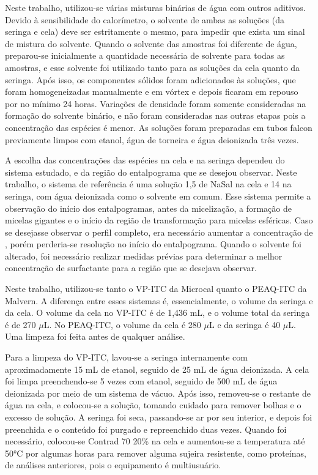 		Neste trabalho, utilizou-se várias misturas binárias de água com outros aditivos. Devido à sensibilidade do calorímetro, o solvente de ambas as soluções (da seringa e cela) deve ser estritamente o mesmo, para impedir que exista um sinal de mistura do solvente. Quando o solvente das amostras foi diferente de água, preparou-se inicialmente a quantidade necessária de solvente para todas as amostras, e esse solvente foi utilizado tanto para as soluções da cela quanto da seringa. Após isso, os componentes sólidos foram adicionados às soluções, que foram homogeneizadas manualmente e em vórtex e depois ficaram em repouso por no mínimo 24 horas. Variações de densidade foram somente consideradas na formação do solvente binário, e não foram consideradas nas outras etapas pois a concentração das espécies é menor. As soluções foram preparadas em tubos falcon previamente limpos com etanol, água de torneira e água deionizada três vezes.
		
		A escolha das concentrações das espécies na cela e na seringa dependeu do sistema estudado, e da região do entalpograma que se desejou observar. Neste trabalho, o sistema de referência é uma solução 1,5 \mM{} de NaSal na cela e \TTAB{} 14 \mM{} na seringa, com água deionizada como o solvente em comum. Esse sistema permite a observação do início dos entalpogramas, antes da micelização, a formação de micelas gigantes e o início da região de transformação para micelas esféricas. Caso se desejasse observar o perfil completo, era necessário aumentar a concentração de \TTAB, porém perderia-se resolução no início do entalpograma. Quando o solvente foi alterado, foi necessário realizar medidas prévias para determinar a melhor concentração de surfactante para a região que se desejava observar.
		
		Neste trabalho, utilizou-se tanto o VP-ITC da Microcal quanto o PEAQ-ITC da Malvern. A diferença entre esses sistemas é, essencialmente, o volume da seringa e da cela. O volume da cela no VP-ITC é de 1,436 mL, e o volume total da seringa é de 270 \(\mu\)L. No PEAQ-ITC, o volume da cela é 280 \(\mu\)L e da seringa é 40 \(\mu\)L. Uma limpeza foi feita antes de qualquer análise.
		
		Para a limpeza do VP-ITC, lavou-se a seringa internamente com aproximadamente 15 mL de etanol, seguido de 25 mL de água deionizada. A cela foi limpa preenchendo-se 5 vezes com etanol, seguido de 500 mL de água deionizada por meio de um sistema de vácuo. Após isso, removeu-se o restante de água na cela, e colocou-se a solução, tomando cuidado para remover bolhas e o excesso de solução. A seringa foi seca, passando-se ar por seu interior, e depois foi preenchida e o conteúdo foi purgado e repreenchido duas vezes. Quando foi necessário, colocou-se Contrad 70 20\% na cela e aumentou-se a temperatura até 50°C por algumas horas para remover alguma sujeira resistente, como proteínas, de análises anteriores, pois o equipamento é multiusuário.
		
